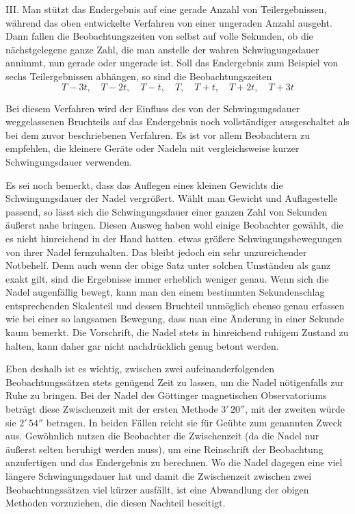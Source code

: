III. Man stützt das Endergebnis auf eine gerade Anzahl von Teilergebnissen, während das oben entwickelte Verfahren von einer ungeraden Anzahl ausgeht. Dann fallen die Beobachtungszeiten von selbst auf volle Sekunden, ob die nächstgelegene ganze Zahl, die man anstelle der wahren Schwingungsdauer annimmt, nun gerade oder ungerade ist. Soll das Endergebnis zum Beispiel von sechs Teilergebnissen abhängen, so sind die Beobachtungszeiten
\[
T-3t,\quad T-2t,\quad T-t,\quad T,\quad T+t,\quad T+2t,\quad T+3t
\]

Bei diesem Verfahren wird der Einfluss des von der Schwingungsdauer weggelassenen Bruchteils auf das Endergebnis noch vollständiger ausgeschaltet als bei dem zuvor beschriebenen Verfahren. Es ist vor allem Beobachtern zu empfehlen, die kleinere Geräte oder Nadeln mit vergleichsweise kurzer Schwingungsdauer verwenden.

Es sei noch bemerkt, dass das Auflegen eines kleinen Gewichts die Schwingungsdauer der Nadel vergrößert. Wählt man Gewicht und Auflagestelle passend, so lässt sich die Schwingungsdauer einer ganzen Zahl von Sekunden äußerst nahe bringen. Diesen Ausweg haben wohl einige Beobachter gewählt, die es nicht hinreichend in der Hand hatten. etwas größere Schwingungsbewegungen von ihrer Nadel fernzuhalten. Das bleibt jedoch ein sehr unzureichender Notbehelf. Denn auch wenn der obige Satz unter solchen Umständen als ganz exakt gilt, sind die Ergebnisse immer erheblich weniger genau. Wenn sich die Nadel augenfällig bewegt, kann man den einem bestimmten Sekundenschlag entsprechenden Skalenteil und dessen Bruchteil unmöglich ebenso genau erfassen wie bei einer so langsamen Bewegung, dass man eine Änderung in einer Sekunde kaum bemerkt. Die Vorschrift, die Nadel stets in hinreichend ruhigem Zustand zu halten, kann daher gar nicht nachdrücklich genug betont werden.

Eben deshalb ist es wichtig, zwischen zwei aufeinanderfolgenden Beobachtungssätzen stets genügend Zeit zu lassen, um die Nadel nötigenfalls zur Ruhe zu bringen. Bei der Nadel des Göttinger magnetischen Observatoriums beträgt diese Zwischenzeit mit der ersten Methode $3'\,20''$, mit der zweiten würde sie $2'\,54''$ betragen. In beiden Fällen reicht sie für Geübte zum genannten Zweck aus. Gewöhnlich nutzen die Beobachter die Zwischenzeit (da
die Nadel nur äußerst selten beruhigt werden muss), um eine Reinschrift der Beobachtung anzufertigen und das Endergebnis zu berechnen. Wo die Nadel dagegen eine viel längere Schwingungsdauer hat und damit die Zwischenzeit zwischen zwei Beobachtungssätzen viel kürzer ausfällt, ist eine Abwandlung der obigen Methoden vorzuziehen, die diesen Nachteil beseitigt.

